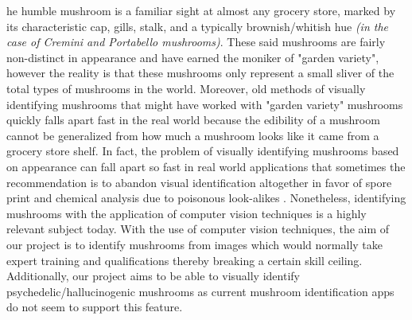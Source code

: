\documentclass[journal]{IEEEtran}
\begin{document}
he humble mushroom is a familiar sight at almost any grocery store, marked by its characteristic cap, gills, stalk, and a typically brownish/whitish hue \textit{(in the case of Cremini and Portabello mushrooms)}. These said mushrooms are fairly non-distinct in appearance and have earned the moniker of "garden variety", however the reality is that these mushrooms only represent a small sliver of the total types of mushrooms in the world. Moreover, old methods of visually identifying mushrooms that might have worked with "garden variety" mushrooms quickly falls apart fast in the real world because the edibility of a mushroom cannot be generalized from how much a mushroom looks like it came from a grocery store shelf. In fact, the problem of visually identifying mushrooms based on appearance can fall apart so fast in real world applications that sometimes the recommendation is to abandon visual identification altogether in favor of spore print and chemical analysis due to poisonous look-alikes \cite{groves1979mushrooms}.
Nonetheless, identifying mushrooms with the application of computer vision techniques is a highly relevant subject today. With the use of computer vision techniques, the aim of our project is to identify mushrooms from images which would normally take expert training and qualifications thereby breaking a certain skill ceiling. Additionally, our project aims to be able to visually identify psychedelic/hallucinogenic mushrooms as current mushroom identification apps do not seem to support this feature.
\end{document}
